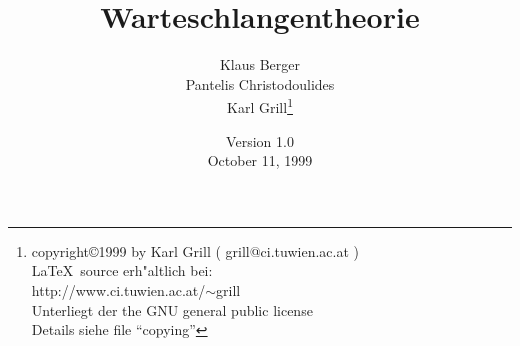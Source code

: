 \setlength{\parindent}{0mm}
\setlength{\parskip}{0.25cm}
\newcommand{\E}{{\rm I\kern-0.2em E}}
\newcommand{\PP}{{\rm I\kern-0.2em P}}
\date{Version 1.0\\October 11, 1999}
\author{Klaus Berger \\
Pantelis Christodoulides \\
Karl Grill\thanks{ copyright\copyright 1999 by Karl Grill
( grill@ci.tuwien.ac.at )
\protect\\ \LaTeX\ source erh"altlich bei:
\protect\\ http://www.ci.tuwien.ac.at/$\sim$grill
\protect\\ Unterliegt der the GNU general public license
\protect\\ Details siehe file ``copying''}}


\makeindex


\title{Warteschlangentheorie}
\maketitle
\tableofcontents


\printindex


